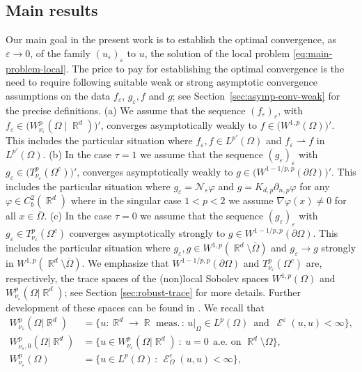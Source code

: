 \documentclass[12pt, reqno]{amsart}%
\theoremstyle{plain}  %
\theoremstyle{definition}  %
\numberwithin{equation}{section}
\DeclareMathOperator{\cE}{\mathcal{E}}
\DeclareMathOperator{\R}{\mathbb{R}}
\newcommand{\eps}{\varepsilon}
\newcommand{\WnuOmRa}{W^p_{\nu_\eps}(\Omega|\R^d )}
\newcommand{\WnuOma}{W^{p}_{\nu_\eps}(\Omega)}
\begin{document}
\subsection{Main results}
Our main goal in the present work is to establish the optimal convergence, as $\eps\to 0$, of the family $(u_\eps)_\eps$ to $u$, the solution of the local problem \eqref{eq:main-problem-local}. The price to pay for establishing  the optimal convergence is the need to require following suitable weak or strong asymptotic convergence assumptions on the data $f_\eps$,  $g_\eps,  f $ and  $g$; see Section~\ref{sec:asymp-conv-weak} for the precise definitions. (a) We assume that the sequence $(f_\eps)_\eps$, with $f_\eps \in \bigl(W^{p}_{\nu_\eps}(\Omega \mid \R^d)\bigr)'$, converges asymptotically weakly to $f \in \bigl(W^{1,p}(\Omega)\bigr)'$. This includes the particular situation where $f_\eps, f\in L^{p'}(\Omega)$ and $f_\eps\rightharpoonup f$ in $L^{p'}(\Omega)$.
(b) In the case $\tau=1$ we assume that the sequence $(g_\eps)_\eps$ with $g_\eps \in \bigl(T^{p}_{\nu_\eps}(\Omega^c)\bigr)'$, converges asymptotically weakly to $g \in \bigl(W^{1-1/p ,p}(\partial\Omega)\bigr)'$.
This includes the particular situation where $g_\eps= \mathcal{N}_\eps \varphi $ and $ g= K_{d,p}\partial_{n,p}\varphi $ for any $\varphi\in C^2_b(\R^d)$ where in the singular case $1<p<2$ we assume $\nabla \varphi(x)\neq 0$ for all $x\in \overline{\Omega}$.
(c) In the case $\tau=0$ we assume that the sequence $(g_\eps)_\eps$ with $g_\eps \in T^{p}_{\nu_\eps}(\Omega^c)$ converges asymptotically strongly to $g \in W^{1-1/p ,p}(\partial\Omega)$. This includes the particular situation where $g_\eps, g\in W^{1,p}(\R^d\setminus \overline{\Omega})$ and $g_\eps\to  g$ strongly in $W^{1,p}(\R^d\setminus \overline{\Omega})$.   We emphasize that  $W^{1-1/p ,p}(\partial\Omega)$ and $T^{p}_{\nu_\eps}(\Omega^c)$ are, respectively, the trace spaces of the (non)local Sobolev spaces $W^{1,p}(\Omega)$ and $\WnuOmRa$; see Section  \ref{sec:robust-trace} for more details. Further development of these spaces can be found in \cite{guy-thesis, Fog21b, FoKa24, Fog25}. We recall that
\begin{align*}
\WnuOmRa
&= \Big\lbrace u: \R^d \to \R \text{ meas.} \,: \, u|_\Omega\in L^p(\Omega)\,\!\text{ and }\,\!  \cE^\eps(u,u) <\infty \Big\rbrace,\\
W^p_{\nu_\eps,0}(\Omega|\R^d)
&= \{ u\in \WnuOmRa~: ~u=0~~\text{a.e. on } \R^d\setminus \Omega\},\\
\WnuOma
&= \Big\lbrace u\in L^p(\Omega)\,\!:\,\!  \cE^\eps_\Omega(u,u) <\infty \Big\rbrace,
\end{align*}
\end{document}
